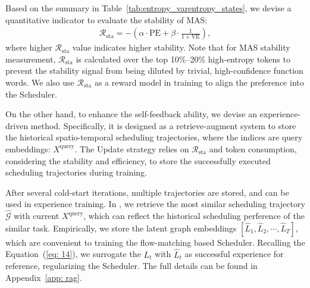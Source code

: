 \begin{table}[!htbp]
\centering
{}
\caption{Taxonomy of System States based on Predictive Entropy (PE) and VarEntropy (VE).}
\label{tab:entropy_varentropy_states}
\end{table}
Based on the summary in Table~\ref{tab:entropy_varentropy_states}, we devise a quantitative indicator to evaluate the stability of MAS:
\begin{gather}
    \mathcal{R}_{\text{sta}} = -(\alpha\cdot \text{PE} + \beta\cdot \frac{1}{1 + \text{VE}}), \label{eq: 18}
\end{gather}
where higher $\mathcal{R}_{\text{sta}}$ value indicates higher stability. Note that for MAS stability measurement, $\mathcal{R}_{\text{sta}}$ is calculated over the top 10\%--20\% high-entropy tokens to prevent the stability signal from being diluted by trivial, high-confidence function words. We also use $\mathcal{R}_{\text{sta}}$ as a reward model in training \ourmethod to align the preference into the Scheduler. 

On the other hand, to enhance the self-feedback ability, we devise an experience-driven method. Specifically, it is designed as a retrieve-augment system to store the historical spatio-temporal scheduling trajectories, where the indices are query embeddings: $X^{\text{query}}$. The Update strategy relies on $\mathcal{R}_{\text{sta}}$ and token consumption, considering the stability and efficiency, to store the successfully executed scheduling trajectories during training. 

After several cold-start iterations, multiple trajectories are stored, and can be used in experience training. In \ourmethod, we retrieve the most similar scheduling trajectory $\hat{\mathcal{G}}$ with current $X^{\text{query}}$, which can reflect the historical scheduling perference of the similar task. Empirically, we store the latent graph embeddings $[\hat{L}_1, \hat{L}_2, \cdots, \hat{L}_{T}]$, which are convenient to training the flow-matching based Scheduler. Recalling the Equation~(\ref{eq: 14}), we surrogate the $L_{t}$ with $\hat{L}_t$ as successful experience for reference, regularizing the Scheduler. The full details can be found in Appendix~\ref{app: rag}.

